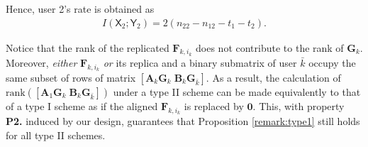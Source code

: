 \documentclass[12pt, draftclsnofoot, onecolumn]{IEEEtran}
\newcommand{\msf}[1]{\mathsf{#1}}
\theoremstyle{definition}
\begin{document}

Hence, user 2's rate is obtained as
\begin{align}
I(\msf{X}_2;\msf{Y}_2) =2(n_{22}-n_{12}-t_1-t_2).
\end{align}



Notice that the rank of the replicated $\boldsymbol{F}_{k,i_k}$ does not contribute to the rank of $\boldsymbol{G}_k$. Moreover, \emph{either} $\boldsymbol{F}_{k,i_k}$ \emph{or} its replica and a binary submatrix of user $\bar{k}$ occupy the same subset of rows of matrix $[\boldsymbol{A}_k\boldsymbol{G}_k \; \boldsymbol{B}_k\boldsymbol{G}_{\bar{k}}]$. As a result, the calculation of $\text{rank}([\boldsymbol{A}_1\boldsymbol{G}_k \; \boldsymbol{B}_k\boldsymbol{G}_{\bar{k}}])$ under a type II scheme can be made equivalently to that of a type I scheme as if the aligned $\boldsymbol{F}_{k,i_k}$ is replaced by $\boldsymbol{0}$. This, with property {\bf P2.} induced by our design, guarantees that Proposition \ref{remark:type1} still holds for all type II schemes.
\end{document}
